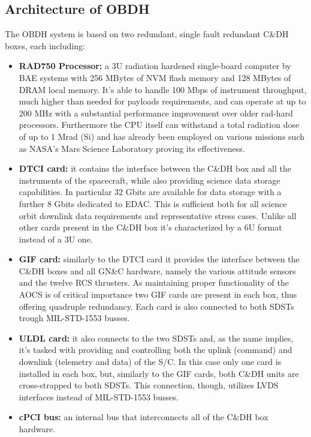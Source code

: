 \subsection{Architecture of OBDH}
\label{subsec:OBDH_architecture}

The OBDH system is based on two redundant, single fault redundant C\&DH boxes, each including:
\begin{itemize}
    \item \textbf{RAD750 Processor:} a 3U radiation hardened single-board computer by BAE systems \cite{C&DH_power} with 256 MBytes of NVM flash memory and 128 MBytes of DRAM local memory. \cite{juno_sito} It's able to handle 100 Mbps of instrument throughput, much higher than needed for payloads requirements, and can operate at up to 200 MHz with a substantial performance improvement over older rad-hard processors. Furthermore the CPU itself can withstand a total radiation dose of up to 1 Mrad (Si) and has already been employed on various missions such as NASA's Mars Science Laboratory proving its effectiveness. \cite{RAD750} \cite{batterie}
    \item \textbf{DTCI card:} it contains the interface between the C\&DH box and all the instruments of the spacecraft, while also providing science data storage capabilities. In particular 32 Gbits are available for data storage with a further 8 Gbits dedicated to EDAC. This is sufficient both for all science orbit downlink data requirements and representative stress cases. Unlike all other cards present in the C\&DH box it's characterized by a 6U format instead of a 3U one. \cite{juno_sito}
    \item \textbf{GIF card:} similarly to the DTCI card it provides the interface between the C\&DH boxes and all GN\&C hardware, namely the various attitude sensors and the twelve RCS thrusters. As maintaining proper functionality of the AOCS is of critical importance two GIF cards are present in each box, thus offering quadruple redundancy. Each card is also connected to both SDSTs trough MIL-STD-1553 \cite{MIL-STD-1553} busses. \cite{juno_telecommunication}   
    \item \textbf{ULDL card:} it also connects to the two SDSTs and, as the name implies, it's tasked with providing and controlling both the uplink (command) and downlink (telemetry and data) of the S/C. In this case only one card is installed in each box, but, similarly to the GIF cards, both C\&DH units are cross-strapped to both SDSTs. This connection, though, utilizes LVDS interfaces instead of MIL-STD-1553 busses. \cite{juno_telecommunication}  
    \item \textbf{cPCI bus:} an internal bus that interconnects all of the C\&DH box hardware. 
\end{itemize}
